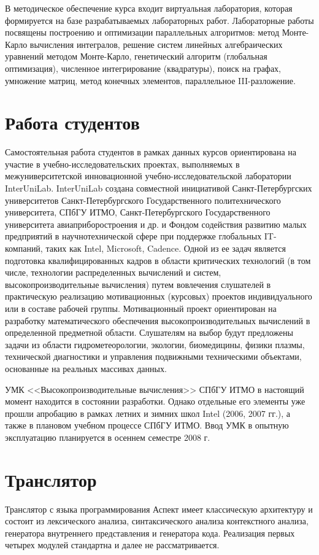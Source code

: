 \documentclass[a4paper,11pt,draft]{article} %
\begin{document}
	В методическое обеспечение курса входит виртуальная лаборатория, которая формируется
	на базе разрабатываемых лабораторных работ. Лабораторные работы посвящены построению и
	оптимизации параллельных алгоритмов: метод Монте-Карло вычисления интегралов, решение
	систем линейных алгебраических уравнений методом Монте-Карло, генетический алгоритм (глобальная оптимизация), численное интегрирование (квадратуры), поиск на графах, умножение
	матриц, метод конечных элементов, параллельное III-разложение.
	
	\section{Работа студентов}
	Самостоятельная работа студентов в рамках данных курсов ориентирована на участие
	в учебно-исследовательских проектах, выполняемых в межуниверситетской инновационной
	учебно-исследовательской лаборатории InterUniLab. InterUniLab создана совместной инициативой Санкт-Петербургских университетов Санкт-Петербургского Государственного политехнического университета, СПбГУ ИТМО, Санкт-Петербургского Государственного университета
	авиаприборостроения и др. и Фондом содействия развитию малых предприятий в научнотехнической сфере при поддержке глобальных IT-компаний, таких как Intel, Microsoft, Cadence.
	Одной из ее задач является подготовка квалифицированных кадров в области критических технологий (в том числе, технологии распределенных вычислений и систем, высокопроизводительные
	вычисления) путем вовлечения слушателей в практическую реализацию мотивационных (курсовых) проектов индивидуального или в составе рабочей группы. Мотивационный проект ориентирован на разработку математического обеспечения высокопроизводительных вычислений в
	определенной предметной области. Слушателям на выбор будут предложены задачи из области
	гидрометеорологии, экологии, биомедицины, физики плазмы, технической диагностики и управления подвижными техническими объектами, основанные на реальных массивах данных.
	{\sloppy
		
	}
	УМК <<Высокопроизводительные вычисления>> СПбГУ ИТМО в настоящий момент находится в состоянии разработки. Однако отдельные его элементы уже прошли апробацию в рамках летних и зимних школ Intel (2006, 2007 гг.), а также в плановом учебном процессе СПбГУ ИТМО. Ввод УМК в опытную эксплуатацию планируется в осеннем семестре 2008 г.
	
	\section{Транслятор}
	Транслятор с языка программирования Аспект имеет классическую архитектуру и состоит из
	лексического анализа, синтаксического анализа контекстного анализа, генератора внутреннего
	представления и генератора кода. Реализация первых четырех модулей стандартна и далее не
	рассматривается.
	
\end{document}
